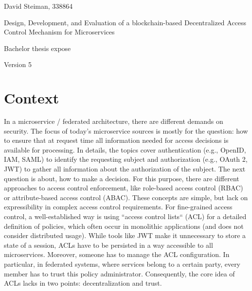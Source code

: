 \documentclass[12pt, conference]{IEEEtran}
\begin{document}
\pagestyle{empty}
\onecolumn

\clearscrheadings\clearscrplain
\begin{center}
David Steiman, 338864 \\

\vspace{8cm}

\begin{Huge}
Design, Development, and Evaluation of a blockchain-based Decentralized Access Control Mechanism for Microservices \\
\end{Huge}
\begin{Large}
Bachelor thesis expose \\
\end{Large}
Version 5 \\


\end{center}
\clearpage

\twocolumn
\pagestyle{useheadings}


\section{Context}
In a microservice / federated architecture, there are different demands on security. The focus of today's microservice sources is mostly for the question: how to ensure that at request time all information needed for access decisions is available for processing. In details, the topics cover authentication (e.g., OpenID, IAM, SAML) to identify the requesting subject and authorization (e.g., OAuth 2, JWT) to gather all information about the authorization of the subject. The next question is about, how to make a decision. For this purpose, there are different approaches to access control enforcement, like role-based access control (RBAC) or attribute-based access control (ABAC). These concepts are simple, but lack on expressibility in complex access control requirements.  For fine-grained access control, a well-established way is using ``access control lists`` (ACL) for a detailed definition of policies, which often occur in monolithic applications (and does not consider distributed usage). While tools like JWT make it unnecessary to store a state of a session, ACLs have to be persisted in a way accessible to all microservices. Moreover, someone has to manage the ACL configuration. In particular, in federated systems, where services belong to a certain party, every member has to trust this policy administrator.
Consequently, the core idea of ACLs lacks in two points: decentralization and trust.
\end{document}
